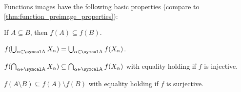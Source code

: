 \begin{proposition}\label{thm:function_image_properties}
  Functions images have the following basic properties (compare to \cref{thm:function_preimage_properties}):
  \begin{propenum}
     If \( A \subseteq B \), then \( f(A) \subseteq f(B) \).

     \( f(\bigcup_{\al \in \CA} X_\al) = \bigcup_{\al \in \CA} f(X_\al) \).

     \( f(\bigcap_{\al \in \CA} X_\al) \subseteq \bigcap_{\al \in \CA} f(X_\al) \) with equality holding if \( f \) is injective.

     \( f(A \setminus B) \subseteq f(A) \setminus f(B) \) with equality holding if \( f \) is surjective.
  \end{propenum}
\end{proposition}
